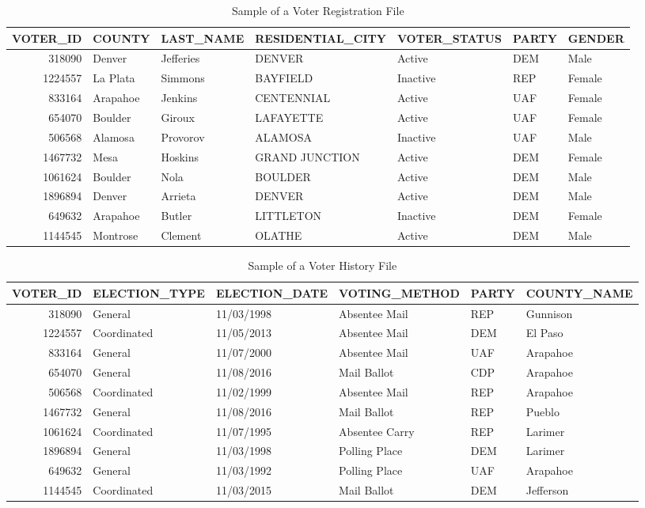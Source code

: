 \documentclass[12pt,twoside]{reedthesis}
\begin{document}
  \begin{sidewaystable}[ht]
  \centering
  \begin{tabular}{rllllll}
    \toprule
  VOTER\_ID & COUNTY & LAST\_NAME & RESIDENTIAL\_CITY & VOTER\_STATUS & PARTY & GENDER \\ 
    \midrule
  318090 & Denver & Jefferies & DENVER & Active & DEM & Male \\ 
    1224557 & La Plata & Simmons & BAYFIELD & Inactive & REP & Female \\ 
    833164 & Arapahoe & Jenkins & CENTENNIAL & Active & UAF & Female \\ 
    654070 & Boulder & Giroux & LAFAYETTE & Active & UAF & Female \\ 
    506568 & Alamosa & Provorov & ALAMOSA & Inactive & UAF & Male \\ 
    1467732 & Mesa & Hoskins & GRAND JUNCTION & Active & DEM & Female \\ 
    1061624 & Boulder & Nola & BOULDER & Active & DEM & Male \\ 
    1896894 & Denver & Arrieta & DENVER & Active & DEM & Male \\ 
    649632 & Arapahoe & Butler & LITTLETON & Inactive & DEM & Female \\ 
    1144545 & Montrose & Clement & OLATHE & Active & DEM & Male \\ 
     \bottomrule
  \end{tabular}
  \caption{Sample of a Voter Registration File \label{tab:vrf_sample}} 
  \end{sidewaystable}\begin{sidewaystable}[ht]
  \centering
  \begin{tabular}{rlllll}
    \toprule
  VOTER\_ID & ELECTION\_TYPE & ELECTION\_DATE & VOTING\_METHOD & PARTY & COUNTY\_NAME \\ 
    \midrule
  318090 & General & 11/03/1998 & Absentee Mail & REP & Gunnison \\ 
    1224557 & Coordinated & 11/05/2013 & Absentee Mail & DEM & El Paso \\ 
    833164 & General & 11/07/2000 & Absentee Mail & UAF & Arapahoe \\ 
    654070 & General & 11/08/2016 & Mail Ballot & CDP & Arapahoe \\ 
    506568 & Coordinated & 11/02/1999 & Absentee Mail & REP & Arapahoe \\ 
    1467732 & General & 11/08/2016 & Mail Ballot & REP & Pueblo \\ 
    1061624 & Coordinated & 11/07/1995 & Absentee Carry & REP & Larimer \\ 
    1896894 & General & 11/03/1998 & Polling Place & DEM & Larimer \\ 
    649632 & General & 11/03/1992 & Polling Place & UAF & Arapahoe \\ 
    1144545 & Coordinated & 11/03/2015 & Mail Ballot & DEM & Jefferson \\ 
     \bottomrule
  \end{tabular}
  \caption{Sample of a Voter History File \label{tab:vrf_sample}} 
  \end{sidewaystable}
  
\end{document}
